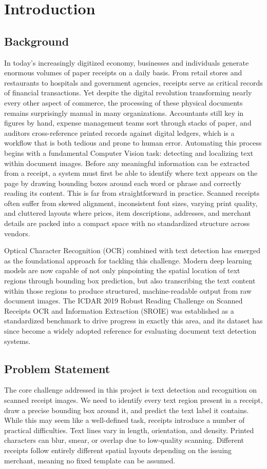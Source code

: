 \section{Introduction}

\subsection{Background}
In today's increasingly digitized economy, businesses and individuals generate enormous volumes of paper receipts on a daily basis. From retail stores and restaurants to hospitals and government agencies, receipts serve as critical records of financial transactions. Yet despite the digital revolution transforming nearly every other aspect of commerce, the processing of these physical documents remains surprisingly manual in many organizations. Accountants still key in figures by hand, expense management teams sort through stacks of paper, and auditors cross-reference printed records against digital ledgers, which is a workflow that is both tedious and prone to human error.
Automating this process begins with a fundamental Computer Vision task: detecting and localizing text within document images. Before any meaningful information can be extracted from a receipt, a system must first be able to identify where text appears on the page by drawing bounding boxes around each word or phrase and correctly reading its content. This is far from straightforward in practice. Scanned receipts often suffer from skewed alignment, inconsistent font sizes, varying print quality, and cluttered layouts where prices, item descriptions, addresses, and merchant details are packed into a compact space with no standardized structure across vendors.

Optical Character Recognition (OCR) combined with text detection has emerged as the foundational approach for tackling this challenge. Modern deep learning models are now capable of not only pinpointing the spatial location of text regions through bounding box prediction, but also transcribing the text content within those regions to produce structured, machine-readable output from raw document images. The ICDAR 2019 Robust Reading Challenge on Scanned Receipts OCR and Information Extraction (SROIE) was established as a standardized benchmark to drive progress in exactly this area, and its dataset has since become a widely adopted reference for evaluating document text detection systems.
\subsection{Problem Statement}
The core challenge addressed in this project is text detection and recognition on scanned receipt images. We need to identify every text region present in a receipt, draw a precise bounding box around it, and predict the text label it contains. While this may seem like a well-defined task, receipts introduce a number of practical difficulties. Text lines vary in length, orientation, and density. Printed characters can blur, smear, or overlap due to low-quality scanning. Different receipts follow entirely different spatial layouts depending on the issuing merchant, meaning no fixed template can be assumed.

